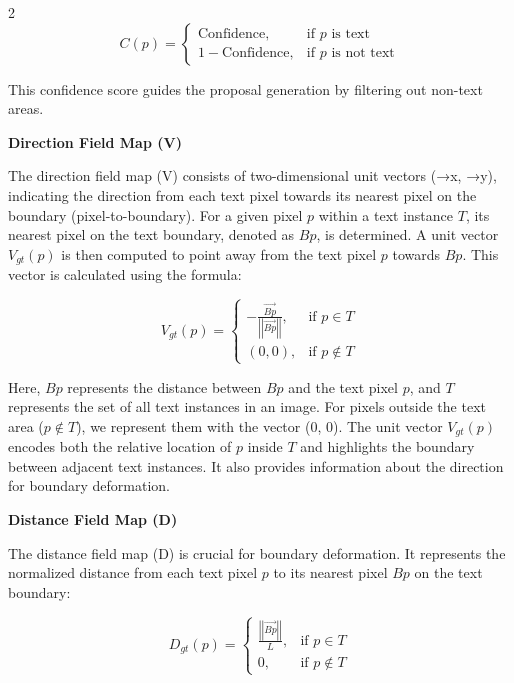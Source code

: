 \documentclass[sn-mathphys,Numbered]{sn-jnl}%
\begin{document}
\begin{multicols}{2}
\begin{equation}
	C(p) =
	\begin{cases}
		\text{Confidence}, & \text{if } p \text{ is text} \\
		1 - \text{Confidence}, & \text{if } p \text{ is not text}
	\end{cases}
\end{equation}

This confidence score guides the proposal generation by filtering out non-text areas.

\textbf{Direction Field Map (V)}

The direction field map (V) consists of two-dimensional unit vectors (→x, →y), indicating the direction from each text pixel towards its nearest pixel on the boundary (pixel-to-boundary). For a given pixel \( p \) within a text instance \( T \), its nearest pixel on the text boundary, denoted as \( Bp \), is determined. A unit vector \( V_{gt}(p) \) is then computed to point away from the text pixel \( p \) towards \( Bp \). This vector is calculated using the formula:

\begin{equation}
	V_{gt}(p) =
	\begin{cases}
		-\frac{\overrightarrow{Bp}}{\left|\left|\overrightarrow{Bp}\right|\right|}, & \text{if } p \in T \\
		(0, 0), & \text{if } p \notin T
	\end{cases}
\end{equation}

Here, \( Bp \) represents the distance between \( Bp \) and the text pixel \( p \), and \( T \) represents the set of all text instances in an image. For pixels outside the text area (\( p \notin T \)), we represent them with the vector (0, 0). The unit vector \( V_{gt}(p) \) encodes both the relative location of \( p \) inside \( T \) and highlights the boundary between adjacent text instances. It also provides information about the direction for boundary deformation.

\textbf{Distance Field Map (D)}

The distance field map (D) is crucial for boundary deformation. It represents the normalized distance from each text pixel \( p \) to its nearest pixel \( Bp \) on the text boundary:

\begin{equation}
	D_{gt}(p) =
	\begin{cases}
		\frac{\left|\left|\overrightarrow{Bp}\right|\right|}{L}, & \text{if } p \in T \\
		0, & \text{if } p \notin T
	\end{cases}
\end{equation}


\end{multicols}
\end{document}
